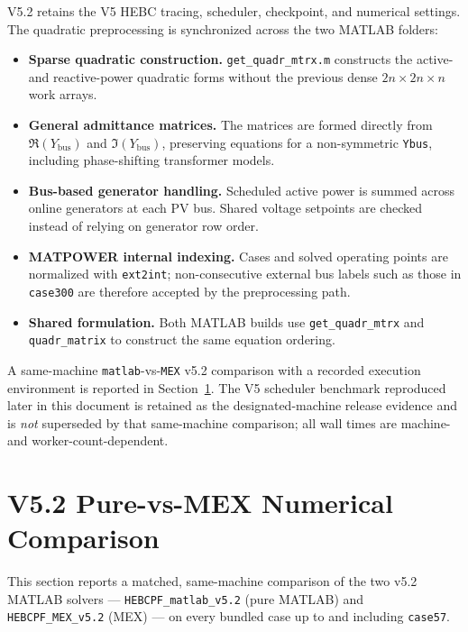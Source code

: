 \documentclass[11pt,a4paper]{article}
\newcommand{\code}[1]{\texttt{#1}}
\begin{document}
V5.2 retains the V5 HEBC tracing, scheduler, checkpoint, and numerical settings. The
quadratic preprocessing is synchronized across the two MATLAB folders:

\begin{itemize}[leftmargin=1.4em]
  \item \textbf{Sparse quadratic construction.} \code{get_quadr_mtrx.m} constructs the
        active- and reactive-power quadratic forms without the previous dense
        $2n\times 2n\times n$ work arrays.
  \item \textbf{General admittance matrices.} The matrices are formed directly from
        $\Re(Y_{\mathrm{bus}})$ and $\Im(Y_{\mathrm{bus}})$, preserving equations for a
        non-symmetric \code{Ybus}, including phase-shifting transformer models.
  \item \textbf{Bus-based generator handling.} Scheduled active power is summed across
        online generators at each PV bus. Shared voltage setpoints are checked instead of
        relying on generator row order.
  \item \textbf{MATPOWER internal indexing.} Cases and solved operating points are
        normalized with \code{ext2int}; non-consecutive external bus labels such as those
        in \code{case300} are therefore accepted by the preprocessing path.
  \item \textbf{Shared formulation.} Both MATLAB builds use \code{get_quadr_mtrx} and
        \code{quadr_matrix} to construct the same equation ordering.
\end{itemize}

A same-machine \code{matlab}-vs-\code{MEX} v5.2 comparison with a recorded execution
environment is reported in Section~\ref{sec:fourway}. The V5 scheduler
benchmark reproduced later in this document is retained as the designated-machine release
evidence and is \emph{not} superseded by that same-machine comparison; all wall times are
machine- and worker-count-dependent.

\section{V5.2 Pure-vs-MEX Numerical Comparison}\label{sec:fourway}

This section reports a matched, same-machine comparison of the two v5.2 MATLAB solvers ---
\textcolor{matcol}{\code{HEBCPF_matlab_v5.2}} (pure MATLAB) and
\textcolor{mexcol}{\code{HEBCPF_MEX_v5.2}} (MEX) --- on every bundled case
up to and including \code{case57}.
\end{document}
